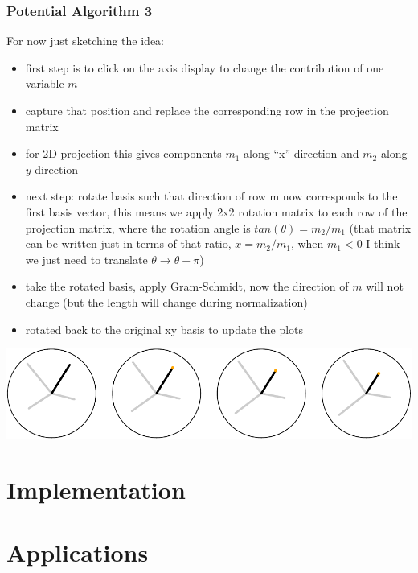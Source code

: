 \documentclass[]{interact}
\theoremstyle{plain}%
\theoremstyle{definition}
\theoremstyle{remark}
\def\tightlist{}
\begin{document}
\hypertarget{potential-algorithm-3}{%
\subsubsection{Potential Algorithm 3}\label{potential-algorithm-3}}

For now just sketching the idea:

\begin{itemize}
\tightlist
\item
  first step is to click on the axis display to change the contribution
  of one variable \(m\)
\item
  capture that position and replace the corresponding row in the
  projection matrix
\item
  for 2D projection this gives components \(m_1\) along ``x'' direction
  and \(m_2\) along \(y\) direction
\item
  next step: rotate basis such that direction of row m now corresponds
  to the first basis vector, this means we apply 2x2 rotation matrix to
  each row of the projection matrix, where the rotation angle is
  \(tan(\theta) = m_2/m_1\) (that matrix can be written just in terms of
  that ratio, \(x= m_2/m_1\), when \(m_1<0\) I think we just need to
  translate \(\theta \rightarrow \theta + \pi\))
\item
  take the rotated basis, apply Gram-Schmidt, now the direction of \(m\)
  will not change (but the length will change during normalization)
\item
  rotated back to the original xy basis to update the plots
\end{itemize}

\includegraphics{paper_files/figure-latex/unnamed-chunk-1-1.pdf}

\hypertarget{sec:implementation}{%
\section{Implementation}\label{sec:implementation}}

\hypertarget{sec:examples}{%
\section{Applications}\label{sec:examples}}
\end{document}
